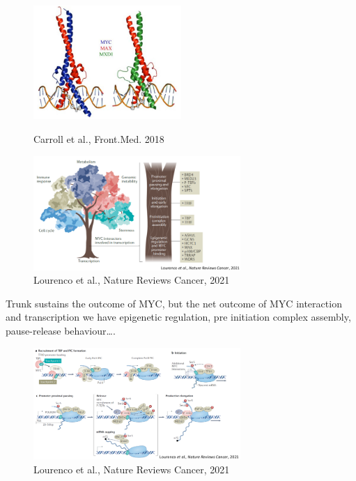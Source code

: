 \begin{figure}[!htb]
   \begin{minipage}{0.48\textwidth}
     \centering
    \includegraphics[width=0.5\textwidth]{../_resources/017e543a7782177edd93188be60ae382.png}
	\caption{Carroll et al., Front.Med. 2018}
	\label{fig:maxmyc}
   \end{minipage}\hfill
   \begin{minipage}{0.48\textwidth}
     \centering
     \includegraphics[width=0.7\textwidth]{../_resources/e218faf59750ef1a90a9e45629f08973.png}
	\caption{Lourenco et al., Nature Reviews Cancer, 2021}
	\label{fig:regmyc}
   \end{minipage}
\end{figure}

Trunk sustains the outcome of MYC, but the net outcome of MYC interaction and transcription we have epigenetic regulation, pre initiation complex assembly, pause-release behaviour\ldots. 

\begin{figure}
\centering
\includegraphics[width=0.7\textwidth]{../_resources/10a2ad3114504053030a1071443aabd7.png}
\caption{Lourenco et al., Nature Reviews Cancer, 2021}
\label{fig:ppmyc}
\end{figure}

